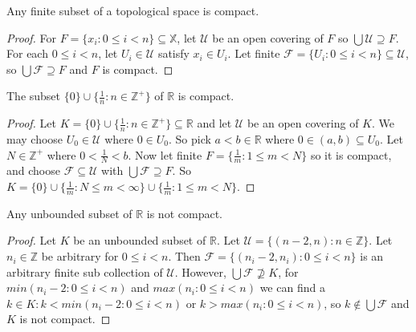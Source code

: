 \documentclass{article}
\begin{document}
	\begin{proposition}
	  Any finite subset of a topological space is compact.
	\end{proposition}

	\begin{proof}
	For $F = \lbrace x_i : 0 \leq i < n \rbrace \subseteq \mathbb{X}$, let $\mathcal{U}$ be an open covering of $F$ so $\bigcup \mathcal{U} \supseteq F$. For each $0 \leq i < n$, let $U_i \in \mathcal{U}$ satisfy $x_i \in U_i$. Let finite $\mathcal{F} = \lbrace U_i : 0 \leq i < n \rbrace \subseteq \mathcal{U}$, so $\bigcup \mathcal{F} \supseteq F$ and $F$ is compact.
	\end{proof}

	\begin{proposition}
	  The subset \(\{0\}\cup\{\frac{1}{n}:n\in\mathbb Z^+\}\) of \(\mathbb R\) is compact.
	\end{proposition}

	\begin{proof}
	Let $K = \lbrace 0 \rbrace \cup \lbrace \frac{1}{n} : n \in \mathbb{Z^+} \rbrace \subseteq \mathbb{R}$ and let $\mathcal{U}$ be an open covering of $K$. We may choose $U_0 \in \mathcal{U}$ where $0 \in U_0$. So pick $a<b \in \mathbb{R}$ where $0 \in (a, b) \subseteq U_0$. Let $N \in \mathbb{Z}^+$ where $0 < \frac{1}{N} < b$. Now let finite $F = \lbrace \frac{1}{m} : 1 \leq m < N \rbrace$ so it is compact, and choose $\mathcal{F} \subseteq \mathcal{U}$ with $\bigcup \mathcal{F} \supseteq F$. So $K = \lbrace 0 \rbrace \cup \lbrace \frac{1}{m} : N \leq m < \infty \rbrace \cup \lbrace \frac{1}{m} : 1 \leq m < N \rbrace$.
	\end{proof}

	\begin{proposition}
	  Any unbounded subset of \(\mathbb R\) is not compact.
	\end{proposition}
	\begin{proof}
	Let $K$ be an unbounded subset of $\mathbb{R}$. Let $\mathcal{U} = \lbrace (n-2, n) : n \in \mathbb{Z} \rbrace$. Let $n_i \in \mathbb{Z}$ be arbitrary for $0 \leq i < n$. Then $\mathcal{F} = \lbrace (n_i - 2, n_i) : 0 \leq i < n \rbrace$ is an arbitrary finite sub collection of $\mathcal{U}$. However, $\bigcup \mathcal{F} \not\supseteq K$, for $min(n_i-2: 0 \leq i < n)$ and $max(n_i : 0 \leq i < n)$ we can find a $k \in K : k < min(n_i-2: 0 \leq i < n)$ or $k > max(n_i : 0 \leq i < n)$, so $k  \not\in \bigcup \mathcal{F}$ and $K$ is not compact.
	\end{proof}	
\end{document}

